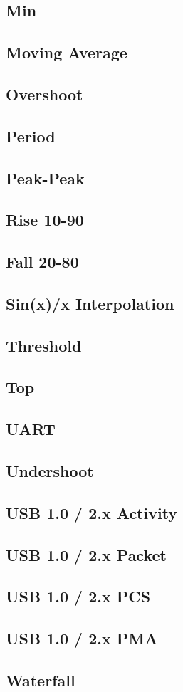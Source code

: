 \subsection{Min}
\subsection{Moving Average}
\subsection{Overshoot}
\subsection{Period}
\subsection{Peak-Peak}
\subsection{Rise 10-90}
\subsection{Fall 20-80}
\subsection{Sin(x)/x Interpolation}
\subsection{Threshold}
\subsection{Top}
\subsection{UART}
\subsection{Undershoot}
\subsection{USB 1.0 / 2.x Activity}
\subsection{USB 1.0 / 2.x Packet}
\subsection{USB 1.0 / 2.x PCS}
\subsection{USB 1.0 / 2.x PMA}
\subsection{Waterfall}
